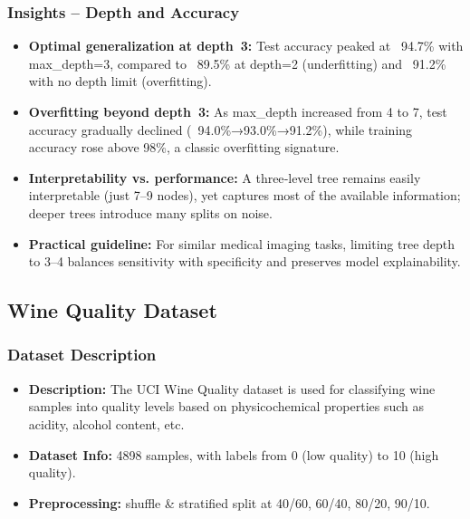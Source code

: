 \subsubsection*{Insights – Depth and Accuracy}
\begin{itemize}
	\item \textbf{Optimal generalization at depth 3:} Test accuracy peaked at ~94.7\% with max\_depth=3, compared to ~89.5\% at depth=2 (underfitting) and ~91.2\% with no depth limit (overfitting).
	\item \textbf{Overfitting beyond depth 3:} As max\_depth increased from 4 to 7, test accuracy gradually declined (~94.0\%→93.0\%→91.2\%), while training accuracy rose above 98\%, a classic overfitting signature.
	\item \textbf{Interpretability vs. performance:} A three‑level tree remains easily interpretable (just 7–9 nodes), yet captures most of the available information; deeper trees introduce many splits on noise.
	\item \textbf{Practical guideline:} For similar medical imaging tasks, limiting tree depth to 3–4 balances sensitivity with specificity and preserves model explainability.
\end{itemize}

\clearpage
\subsection{Wine Quality Dataset}
\subsubsection*{Dataset Description}
\begin{itemize}
	\item \textbf{Description:} The UCI Wine Quality dataset is used for classifying wine samples into quality levels based on physicochemical properties such as acidity, alcohol content, etc.
	\item \textbf{Dataset Info:} 4898 samples, with labels from 0 (low quality) to 10 (high quality).
	\item \textbf{Preprocessing:} shuffle \& stratified split at 40/60, 60/40, 80/20, 90/10.
\end{itemize}

